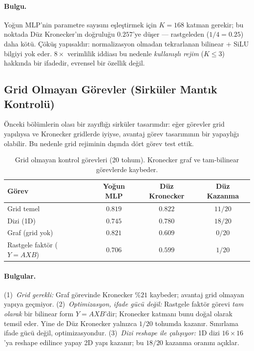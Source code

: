 \documentclass[11pt,a4paper]{article}
\begin{document}
\paragraph{Bulgu.}
Yoğun MLP'nin parametre sayısını eşleştirmek için $K=168$ katman
gerekir; bu noktada Düz Kronecker'ın doğruluğu $0.257$'ye düşer ---
rastgeleden ($1/4 = 0.25$) daha kötü. Çöküş yapısaldır: normalizasyon
olmadan tekrarlanan bilinear + SiLU bilgiyi yok eder. $8\times$
verimlilik iddiası bu nedenle \emph{kullanışlı rejim} ($K \leq 3$)
hakkında bir ifadedir, evrensel bir özellik değil.

\subsection{Grid Olmayan Görevler (Sirküler Mantık Kontrolü)}
\label{sec:non-grid}

Önceki bölümlerin olası bir zayıflığı sirküler tasarımdır: eğer görevler
grid yapılıysa ve Kronecker gridlerde iyiyse, avantaj görev tasarımının
bir yapaylığı olabilir. Bu nedenle grid rejiminin dışında dört görev
test ettik.

\begin{table}[h]
\centering
\caption{Grid olmayan kontrol görevleri (20 tohum). Kronecker graf ve
tam-bilinear görevlerde kaybeder.}
\label{tab:non-grid}
\small
\begin{tabular}{lccc}
\toprule
Görev & Yoğun MLP & Düz Kronecker & Düz Kazanma \\
\midrule
Grid temel           & $0.819$ & $0.822$ & $11/20$ \\
Dizi (1D)            & $0.745$ & $\mathbf{0.780}$ & $18/20$ \\
Graf (grid yok)      & $\mathbf{0.821}$ & $0.609$ & $0/20$ \\
Rastgele faktör ($Y = AXB$) & $\mathbf{0.706}$ & $0.599$ & $1/20$ \\
\bottomrule
\end{tabular}
\end{table}

\paragraph{Bulgular.}
(1)~\emph{Grid gerekli:} Graf görevinde Kronecker $\%21$ kaybeder;
avantaj grid olmayan yapıya geçmiyor.
(2)~\emph{Optimizasyon, ifade gücü değil:} Rastgele faktör görevi
\emph{tam olarak} bir bilinear form $Y = AXB$'dir; Kronecker katmanı
bunu doğal olarak temsil eder. Yine de Düz Kronecker yalnızca
$1/20$ tohumda kazanır. Sınırlama ifade gücü değil, optimizasyondur.
(3)~\emph{Dizi reshape ile çalışıyor:} 1D dizi $16 \times 16$'ya
reshape edilince yapay 2D yapı kazanır; bu $18/20$ kazanma oranını
açıklar.
\end{document}
